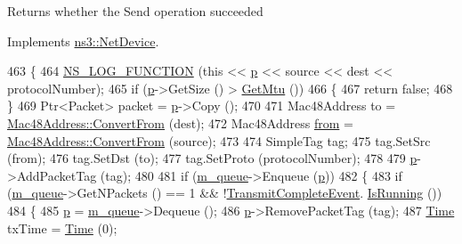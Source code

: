 \begin{DoxyReturn}{Returns}
whether the Send operation succeeded 
\end{DoxyReturn}


Implements \hyperlink{classns3_1_1NetDevice_a19d55a4746c1ae584bf7da69959a885b}{ns3\+::\+Net\+Device}.


\begin{DoxyCode}
463 \{
464   \hyperlink{log-macros-disabled_8h_a90b90d5bad1f39cb1b64923ea94c0761}{NS\_LOG\_FUNCTION} (\textcolor{keyword}{this} << \hyperlink{lte__link__budget_8m_ac9de518908a968428863f829398a4e62}{p} << source << dest << protocolNumber);
465   \textcolor{keywordflow}{if} (\hyperlink{lte__link__budget_8m_ac9de518908a968428863f829398a4e62}{p}->GetSize () > \hyperlink{classns3_1_1SimpleNetDevice_a6bb1552655bbede11e48a9b434121bab}{GetMtu} ())
466     \{
467       \textcolor{keywordflow}{return} \textcolor{keyword}{false};
468     \}
469   Ptr<Packet> packet = \hyperlink{lte__link__budget_8m_ac9de518908a968428863f829398a4e62}{p}->Copy ();
470 
471   Mac48Address to = \hyperlink{classns3_1_1Mac48Address_a911ce13603a9ef837545a032b6523ae4}{Mac48Address::ConvertFrom} (dest);
472   Mac48Address \hyperlink{lte__amc_8m_a1b4c81ff74eb1a626b5ade44c81004b3}{from} = \hyperlink{classns3_1_1Mac48Address_a911ce13603a9ef837545a032b6523ae4}{Mac48Address::ConvertFrom} (source);
473 
474   SimpleTag tag;
475   tag.SetSrc (from);
476   tag.SetDst (to);
477   tag.SetProto (protocolNumber);
478 
479   \hyperlink{lte__link__budget_8m_ac9de518908a968428863f829398a4e62}{p}->AddPacketTag (tag);
480 
481   \textcolor{keywordflow}{if} (\hyperlink{classns3_1_1SimpleNetDevice_a72e1e606223c7e4683f64259d14ef065}{m\_queue}->Enqueue (\hyperlink{lte__link__budget_8m_ac9de518908a968428863f829398a4e62}{p}))
482     \{
483       \textcolor{keywordflow}{if} (\hyperlink{classns3_1_1SimpleNetDevice_a72e1e606223c7e4683f64259d14ef065}{m\_queue}->GetNPackets () == 1 && !\hyperlink{classns3_1_1SimpleNetDevice_ad6fa5b2d21a557883c8c6d615ee6f066}{TransmitCompleteEvent}.
      \hyperlink{classns3_1_1EventId_aabf8476d1a080c199ea0c6aa9ccea372}{IsRunning} ())
484         \{
485           \hyperlink{lte__link__budget_8m_ac9de518908a968428863f829398a4e62}{p} = \hyperlink{classns3_1_1SimpleNetDevice_a72e1e606223c7e4683f64259d14ef065}{m\_queue}->Dequeue ();
486           \hyperlink{lte__link__budget_8m_ac9de518908a968428863f829398a4e62}{p}->RemovePacketTag (tag);
487           \hyperlink{namespacens3_1_1TracedValueCallback_a7ffd3e7c142ffe7c8a1d2db9b8de38ec}{Time} txTime = \hyperlink{namespacens3_1_1TracedValueCallback_a7ffd3e7c142ffe7c8a1d2db9b8de38ec}{Time} (0);

\end{DoxyCode}
